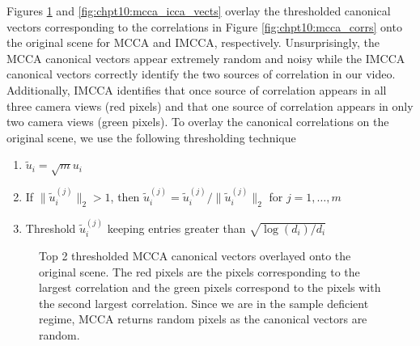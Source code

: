 Figures \ref{fig:chpt10:mcca_cca_vects} and \ref{fig:chpt10:mcca_icca_vects} overlay the
thresholded canonical vectors corresponding to the correlations in Figure
\ref{fig:chpt10:mcca_corrs} onto the original scene for MCCA and IMCCA,
respectively. Unsurprisingly, the MCCA canonical vectors appear extremely random and noisy
while the IMCCA canonical vectors correctly identify the two sources of correlation in our
video. Additionally, IMCCA identifies that once source of correlation appears in all three
camera views (red pixels) and that one source of correlation appears in only two camera
views (green pixels). To overlay the canonical correlations on the original scene, we use
the following thresholding technique
\begin{enumerate}
\item $\widetilde{u}_i = \sqrt{m}u_i$
\item If $\|\widetilde{u}_i^{(j)}\|_2 >1$, then $\widetilde{u}_i^{(j)} =
  \widetilde{u}_i^{(j)}/\|\widetilde{u}_i^{(j)}\|_2$ for $j=1,\dots,m$
\item Threshold $\widetilde{u}_i^{(j)}$ keeping entries greater than $\sqrt{\log(d_i)/d_i}$
\end{enumerate}

\begin{figure}
  \begin{center}
    \caption{Top 2 thresholded MCCA canonical vectors overlayed onto the original
      scene. The red pixels are the pixels corresponding to the largest correlation and
      the green pixels correspond to the pixels with the second largest correlation. Since
      we are in the sample deficient regime, MCCA returns random pixels as the canonical
      vectors are random.}
    \label{fig:chpt10:mcca_cca_vects}
  \end{center}
\end{figure}

